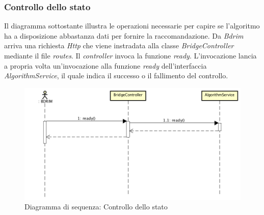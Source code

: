 \subsubsection*{Controllo dello stato}
Il diagramma sottostante illustra le operazioni necessarie per capire se l'algoritmo ha a disposizione abbastanza dati per fornire la raccomandazione. Da \textit{Bdrim} arriva una richiesta \textit{Http} che viene instradata alla classe \textit{BridgeController} mediante il file \textit{routes}. Il \textit{controller} invoca la funzione \textit{ready}. L'invocazione lancia a propria volta un'invocazione alla funzione \textit{ready} dell'interfaccia \textit{AlgorithmService}, il quale indica il successo o il fallimento del controllo.
\begin{figure}[h]
\centering
\includegraphics[width=0.9\linewidth]{immagini/sequenzaReady}
\caption[Diagramma di sequenza: Controllo dello stato]{Diagramma di sequenza: Controllo dello stato}
\label{fig:sequenzaReady}
\end{figure}


